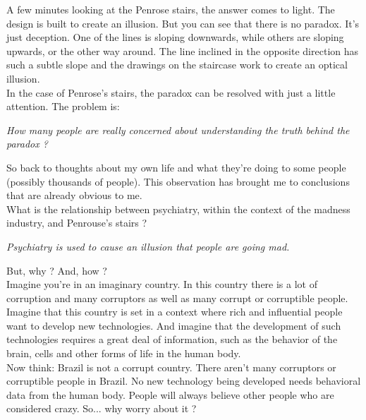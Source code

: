 \documentclass[11pt]{book}
\begin{document}
\noindent A few minutes looking at the Penrose stairs, the answer comes to light. The design is built to create an illusion. But you can see that there is no paradox. It's just deception. One of the lines is sloping downwards, while others are sloping upwards, or the other way around. The line inclined in the opposite direction has such a subtle slope and the drawings on the staircase work to create an optical illusion. \\

\noindent In the case of Penrose's stairs, the paradox can be resolved with just a little attention. The problem is: 

\noindent \begin{center} \emph{How many people are really concerned about understanding the truth behind the paradox ?} \end{center}

\noindent So back to thoughts about my own life and what they're doing to some people (possibly thousands of people). This observation has brought me to conclusions that are already obvious to me. \\

\noindent What is the relationship between psychiatry, within the context of the madness industry, and Penrouse's stairs ?

\noindent \begin{center} \emph{Psychiatry is used to cause an illusion that people are going mad.} \end{center}

\noindent But, why ? And, how  ? \\

\noindent Imagine you're in an imaginary country. In this country there is a lot of corruption and many corruptors as well as many corrupt or corruptible people. \\

\noindent Imagine that this country is set in a context where rich and influential people want to develop new technologies. And imagine that the development of such technologies requires a great deal of information, such as the behavior of the brain, cells and other forms of life in the human body. \\

\noindent Now think: Brazil is not a corrupt country. There aren't many corruptors or corruptible people in Brazil. No new technology being developed needs behavioral data from the human body. People will always believe other people who are considered crazy. So... why worry about it ? \\
\end{document}
